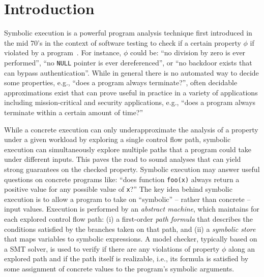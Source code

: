 
\section{Introduction}

Symbolic execution is a powerful program analysis technique first introduced in the mid 70's in the context of software testing to check if a certain property $\phi$ if violated by a program~\cite{K-CACM76,H-TSE77}. For instance, $\phi$ could be: ``no division by zero is ever performed'', ``no {\tt NULL} pointer is ever dereferenced'', or ``no backdoor exists that can bypass authentication''. While in general there is no automated way to decide some properties, e.g., ``does a program always terminate?'', often decidable approximations exist that can prove useful in practice in a variety of applications including mission-critical and security applications, e.g., ``does a program always terminate within a certain amount of time?''

While a concrete execution can only underapproximate the analysis of a property under a given workload by exploring a single control flow path, symbolic execution can simultaneously explore multiple paths that a program could take under different inputs. This paves the road to sound analyses that can yield strong guarantees on the checked property. Symbolic execution may answer useful questions on concrete programs like: ``does function {\tt foo(x)} always return a positive value for any possible value of {\tt x}?'' The key idea behind symbolic execution is to allow a program to take on ``symbolic'' -- rather than concrete -- input values. Execution is performed by an {\em abstract machine}, which maintains for each explored control flow path: (i) a first-order {\em path formula} that describes the conditions satisfied by the branches taken on that path, and (ii) a {\em symbolic store} that maps variables to symbolic expressions. A model checker, typically based on a SMT solver, is used to verify if there are any violations of property $\phi$ along an explored path and if the path itself is realizable, i.e., its formula is satisfied by some assignment of concrete values to the program's symbolic arguments.


